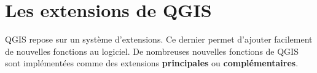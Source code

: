 


\section{Les extensions de QGIS}\label{sec:extensions}



QGIS repose sur un système d'extensions.
Ce dernier permet d'ajouter facilement de nouvelles fonctions au logiciel. 
De nombreuses nouvelles fonctions de QGIS sont implémentées comme des extensions \textbf{principales} ou \textbf{complémentaires}.  


